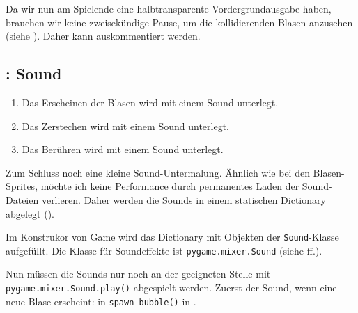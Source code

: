 
Da wir nun am Spielende eine halbtransparente Vordergrundausgabe haben, brauchen wir keine zweisekündige Pause, um die kollidierenden Blasen anzusehen (siehe ). Daher kann  auskommentiert werden.

\newpage
{}  

\subsection{: Sound}
\begin{enumerate}
 \item Das Erscheinen der Blasen wird mit einem Sound unterlegt.\label{reqSoundErscheinen}
 \item Das Zerstechen wird mit einem Sound unterlegt.\label{reqSoundZerstechen}
 \item Das Berühren wird mit einem Sound unterlegt.\label{reqSoundBerühren}
\end{enumerate}
\er

Zum Schluss noch eine kleine Sound-Untermalung. Ähnlich wie bei den Blasen-Sprites, möchte ich keine Performance durch permanentes Laden der Sound-Dateien verlieren. Daher werden die Sounds in einem statischen Dictionary abgelegt (). 



Im Konstrukor von Game wird das Dictionary mit Objekten der \texttt{Sound}-Klasse aufgefüllt. Die Klasse für Soundeffekte ist \texttt{pygame.mixer.Sound} (siehe ff.).

\newpage
{}  

Nun müssen die Sounds nur noch an der geeigneten Stelle mit \texttt{pygame.mixer.Sound.\-play()} abgespielt werden. Zuerst der Sound, wenn eine neue Blase erscheint: in \texttt{spawn\_\-bubb\-le()} in .

